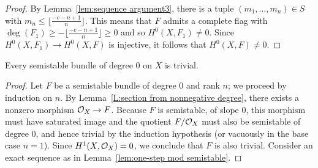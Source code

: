 \begin{proof}
By Lemma~\ref{lem:sequence argument3}, there is a tuple $(m_1,\dots,m_n) \in S$ with $m_n \leq \lfloor \frac{-c-n+1}{n} \rfloor$.
This means that $F$ admits a complete flag with $\deg(F_1) \geq - \lfloor \frac{-c-n+1}{n} \rfloor \geq 0$ and so $H^0(X, F_1) \neq 0$.
Since $H^0(X, F_1) \to H^0(X, F)$ is injective, it follows that $H^0(X, F)\neq 0$.
\end{proof}

\begin{proposition} \label{prop:semistable slope 0}
Every semistable bundle of degree $0$ on $X$ is trivial.
\end{proposition}
\begin{proof}
Let $F$ be a semistable bundle of degree $0$ and rank $n$; we proceed by induction on $n$.
By Lemma~\ref{L:section from nonnegative degree}, there exists a nonzero morphism $\mathcal{O}_X \to F$.
Because $F$ is semistable, of slope $0$, this morphism must have saturated image and the quotient $F/\mathcal{O}_X$ must also be semistable of degree $0$, and hence trivial by the induction hypothesis (or vacuously in the base case $n=1$). 
Since $H^1(X, \mathcal{O}_X) = 0$, we conclude that $F$ is also trivial.
Consider an exact sequence as in Lemma~\ref{lem:one-step mod semistable}.
\end{proof}

